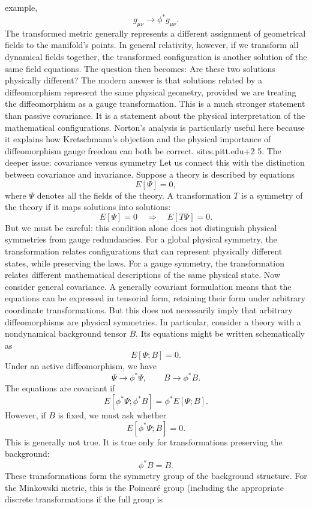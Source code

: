 example, \[ g_{\mu\nu}\longrightarrow \phi^*g_{\mu\nu}. \] The transformed
metric generally represents a different assignment of geometrical fields to the
manifold's points. In general relativity, however, if we transform all
dynamical fields together, the transformed configuration is another solution of
the same field equations. The question then becomes: Are these two solutions
physically different? The modern answer is that solutions related by a
diffeomorphism represent the same physical geometry, provided we are treating
the diffeomorphism as a gauge transformation. This is a much stronger statement
than passive covariance. It is a statement about the physical interpretation of
the mathematical configurations. Norton's analysis is particularly useful here
because it explains how Kretschmann's objection and the physical importance of
diffeomorphism gauge freedom can both be correct. sites.pitt.edu+2 5. The
deeper issue: covariance versus symmetry Let us connect this with the
distinction between covariance and invariance. Suppose a theory is described by
equations \[ E[\Psi]=0, \] where \(\Psi\) denotes all the fields of the theory.
A transformation \(T\) is a symmetry of the theory if it maps solutions into
solutions: \[ E[\Psi]=0 \quad\Longrightarrow\quad E[T\Psi]=0. \] But we must be
careful: this condition alone does not distinguish physical symmetries from
gauge redundancies. For a global physical symmetry, the transformation relates
configurations that can represent physically different states, while preserving
the laws. For a gauge symmetry, the transformation relates different
mathematical descriptions of the same physical state. Now consider general
covariance. A generally covariant formulation means that the equations can be
expressed in tensorial form, retaining their form under arbitrary coordinate
transformations. But this does not necessarily imply that arbitrary
diffeomorphisms are physical symmetries. In particular, consider a theory with
a nondynamical background tensor \(B\). Its equations might be written
schematically as \[ E[\Psi;B]=0. \] Under an active diffeomorphism, we have \[
    \Psi\longrightarrow\phi^*\Psi, \qquad B\longrightarrow\phi^*B. \] The
equations are covariant if \[ E[\phi^*\Psi;\phi^*B] = \phi^*E[\Psi;B]. \]
However, if \(B\) is fixed, we must ask whether \[ E[\phi^*\Psi;B]=0. \] This
is generally not true. It is true only for transformations preserving the
background: \[ \phi^*B=B. \] These transformations form the symmetry group of
the background structure. For the Minkowski metric, this is the Poincaré group
(including the appropriate discrete transformations if the full group is
